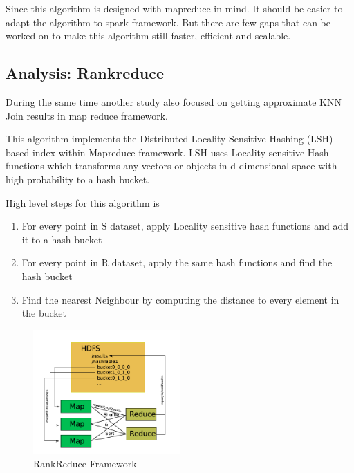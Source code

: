 \documentclass[conference]{IEEEtran}
\begin{document}
\bigskip

Since this algorithm is designed with mapreduce in mind. It should be
easier to adapt the algorithm to spark framework. But there are few
gaps that can be worked on to make this algorithm still faster,
efficient and scalable.

\subsection{Analysis: Rankreduce}

During the same time another study
\cite{stupar_rankreduceprocessing_2010} also focused on getting
approximate KNN Join results in map reduce framework.

\medskip

This algorithm implements the Distributed Locality Sensitive Hashing (LSH)
based index within Mapreduce framework. LSH uses Locality sensitive
Hash functions which transforms any vectors or objects in d
dimensional space with high probability to a hash bucket.

\bigskip

High level steps for this algorithm is
\begin{enumerate}
\item For every point in S dataset, apply Locality sensitive hash
  functions and add it to a hash bucket
\item For every point in R dataset, apply the same hash functions and
  find the hash bucket
\item Find the nearest Neighbour by computing the distance to every
  element in the bucket
\end{enumerate}


\begin{figure}[here]
\includegraphics[width=0.5\textwidth]{rankreduce.png}
\caption{RankReduce Framework}
\label{fig:rankreduce.png}
\end{figure}

\bigskip
\end{document}
